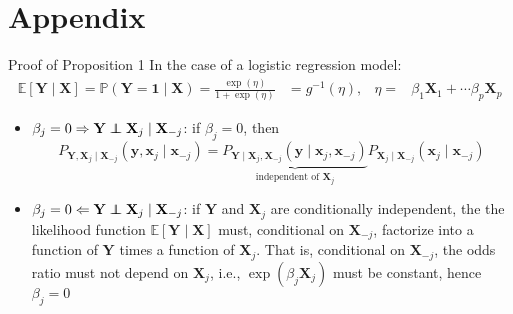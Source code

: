\section*{Appendix}

 \frame{\sectionpage}

\begin{frame}{Proof of Proposition 1}\label{proof_prop1}
    \small 
    In the case of a logistic regression model:
    \begin{align*}
        \mathbb{E}[\mathbf{Y}\mid \mathbf{X}] = \mathbb{P}(\mathbf{Y}=\mathbf{1}\mid \mathbf{X}) = \frac{\exp(\eta)}{1+\exp(\eta)} &= g^{-1}(\eta), & \eta =&\beta_1\mathbf{X}_1 +\cdots \beta_p\mathbf{X}_p
    \end{align*}
    \begin{itemize}
        \item $\beta_j = 0 \Rightarrow \mathbf{Y}\perp\!\!\!\!\perp \mathbf{X}_j\mid\mathbf{X}_{-j}$: if $\beta_j = 0$, then
        $$
        P_{\mathbf{Y},\mathbf{X}_j\mid\mathbf{X}_{-j}}(\mathbf{y},\mathbf{x}_j\mid \mathbf{x}_{-j}) = \underbrace{P_{\mathbf{Y}\mid \mathbf{X}_j,\mathbf{X}_{-j}}(\mathbf{y}\mid \mathbf{x}_j,\mathbf{x}_{-j})}_{\text{independent of } \mathbf{X}_j} P_{\mathbf{X}_j\mid \mathbf{X}_{-j}}(\mathbf{x}_j\mid \mathbf{x}_{-j})
        $$
        \item $\beta_j = 0 \Leftarrow \mathbf{Y}\perp\!\!\!\!\perp \mathbf{X}_j\mid\mathbf{X}_{-j}$: if $\mathbf{Y}$ and $\mathbf{X}_j$ are conditionally independent, the the likelihood function $\mathbb{E}[\mathbf{Y}\mid \mathbf{X}]$ must, conditional on $\mathbf{X}_{-j}$, factorize into a function of $\mathbf{Y}$ times a function of $\mathbf{X}_j$. That is, conditional on $\mathbf{X}_{-j}$, the odds ratio must not depend on $\mathbf{X}_j$, i.e., $\exp(\beta_j\mathbf{X}_j)$ must be constant, hence $\beta_j =0$  \hfill \hyperlink{prop1}{}
    \end{itemize}
    

\end{frame}